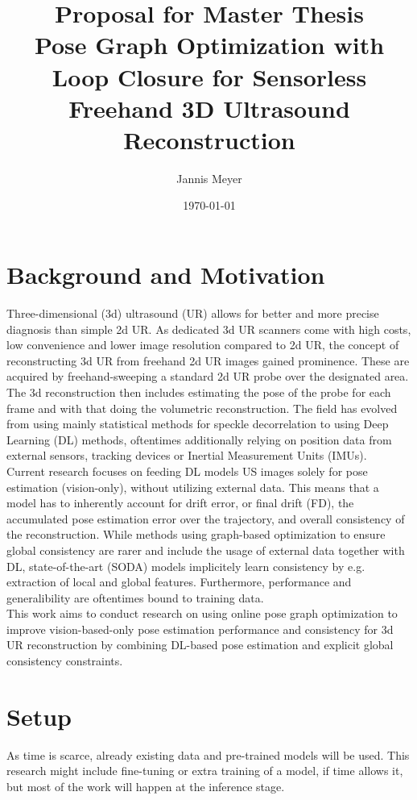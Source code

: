\documentclass[10.5pt,a4paper]{article}
\title{\textbf{Proposal for Master Thesis} \\  Pose Graph Optimization with Loop Closure for Sensorless Freehand 3D Ultrasound Reconstruction}
\author{Jannis Meyer}
\date{\today}
\begin{document}
\maketitle

\section{Background and Motivation}
Three-dimensional (3d) ultrasound (UR) allows for better and more precise diagnosis than simple 2d UR. As dedicated 3d UR scanners come with high costs, low convenience and lower image resolution compared to 2d UR, the concept of reconstructing 3d UR from freehand 2d UR images gained prominence. These are acquired by freehand-sweeping a standard 2d UR probe over the designated area. The 3d reconstruction then includes estimating the pose of the probe for each frame and with that doing the volumetric reconstruction. The field has evolved from using mainly statistical methods for speckle decorrelation\cite{Gee.2006} to using Deep Learning (DL) methods\cite{Buchanan.2024}, oftentimes additionally relying on position data from external sensors, tracking devices or Inertial Measurement Units (IMUs).\\
Current research focuses on feeding DL models US images solely for pose estimation (vision-only), without utilizing external data\cite{Wilson.2025, Li.2025}. This means that a model has to inherently account for drift error, or final drift (FD), the accumulated pose estimation error over the trajectory, and overall consistency of the reconstruction\cite{Adriaans.2024}. While methods using graph-based optimization to ensure global consistency are rarer and include the usage of external data together with DL\cite{Tetrel.2016}, state-of-the-art (SODA) models implicitely learn consistency by e.g. extraction of local and global features\cite{Wilson.2025}. Furthermore, performance and generalibility are oftentimes bound to training data.\\
This work aims to conduct research on using online pose graph optimization to improve vision-based-only pose estimation performance and consistency for 3d UR reconstruction by combining DL-based pose estimation and explicit global consistency constraints.

\section{Setup}
As time is scarce, already existing data and pre-trained models will be used. This research might include fine-tuning or extra training of a model, if time allows it, but most of the work will happen at the inference stage.
\end{document}
